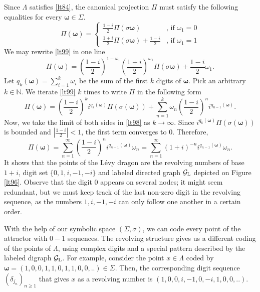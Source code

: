 \documentclass[12pt, a4paper]{amsart}
\numberwithin{equation}{section}
\numberwithin{theorem}{section}
\begin{document}
Since $\Lambda$ satisfies \eqref{lt84}, the canonical projection $\Pi$ must satisfy the following equalities for every $\pmb{\omega}\in\Sigma$.
\begin{equation}\label{lt99}
    \Pi(\pmb{\omega})=\begin{cases}
        \frac{1-i}{2}\Pi(\sigma\pmb{\omega}) &\mbox{, if } \omega_1=0 \\
        \frac{1+i}{2}\Pi(\sigma\pmb{\omega})+\frac{1-i}{2} &\mbox{, if } \omega_1=1
    \end{cases}
\end{equation}
We may rewrite \eqref{lt99} in one line 
\begin{equation}\label{lt95}
    \Pi(\pmb{\omega})=\left(\frac{1-i}{2}\right)^{1-\omega_1}\left(\frac{1+i}{2}\right)^{\omega_1}\Pi(\sigma\pmb{\omega})+\frac{1-i}{2}\omega_1.
\end{equation}
Let $q_k(\pmb{\omega})=\sum_{i=1}^{k} \omega_i$ be the sum of the first $k$ digits of $\pmb{\omega}$. Pick an arbitrary $k\in\mathbb{N}$. We iterate \eqref{lt99} $k$ times to write $\Pi$ in the following form 
\begin{equation}\label{lt98}
    \Pi(\pmb{\omega})=\left(\frac{1-i}{2}\right)^k i^{q_k(\pmb{\omega})} \Pi(\sigma(\pmb{\omega})) +
    \sum_{n=1}^{k}\omega_n\left(\frac{1-i}{2}\right)^n i^{q_{n-1}(\pmb{\omega})}.
\end{equation}
Now, we take the limit of both sides in \eqref{lt98} as $k\to\infty$. Since $i^{q_k(\pmb{\omega})} \Pi(\sigma(\pmb{\omega}))$ is bounded and $\left|\frac{1-i}{2}\right|<1$, the first term converges to $0$. Therefore,
\begin{equation}\label{lt97}
    \Pi(\pmb{\omega})=\sum_{n=1}^{\infty} \left(\frac{1-i}{2}\right)^n i^{q_{n-1}(\pmb{\omega})} \omega_n = \sum_{n=1}^{\infty} (1+i)^{-n} i^{q_{n-1}(\pmb{\omega})} \omega_n .
\end{equation}
It shows that the points of the L\'evy dragon are the revolving numbers of base $1+i$, digit set $\{0,1,i,-1,-i\}$ and labeled directed graph $\mathcal{G}_{\rm L}$ depicted on Figure \ref{lt96}. Observe that the digit $0$ appears on several nodes; it might seem redundant, but we must keep track of the last non-zero digit in the revolving sequence, as the numbers $1,i,-1,-i$ can only follow one another in a certain order.

With the help of our symbolic space $(\Sigma,\sigma)$, we can code every point of the attractor with $0-1$ sequences. The revolving structure gives us a different coding of the points of $\Lambda$, using complex digits and a special pattern described by the labeled digraph $\mathcal{G}_{\rm L}$. For example, consider the point $x\in\Lambda$ coded by $\pmb{\omega}=(1,0,0,1,1,0,1,1,0,0,..)\in\Sigma$. Then, the corresponding digit sequence $(\delta_{j_n})_{n\geq 1}$ that gives $x$ as a revolving number is $(1,0,0,i,-1,0,-i,1,0,0,..)$.
\end{document}
